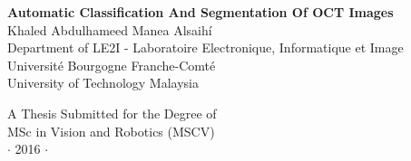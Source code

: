 

\newpage
\thispagestyle{empty}


\vspace*{2cm}
\begin{center}
{\Large\bf Automatic Classification And Segmentation Of OCT Images\\} \vspace{2cm} {\large
Khaled Abdulhameed Manea Alsaih\'i\\
\vspace{2cm}
Department of LE2I - Laboratoire Electronique, Informatique et Image \\
Université Bourgogne Franche-Comté \\
University of Technology Malaysia }
\end{center}

\vspace{7cm}
\begin{center}
{\large A Thesis Submitted for the Degree of \\MSc
in Vision and Robotics (MSCV) \\\vspace{0.3cm} $\cdot$ 2016
$\cdot$}
\end{center}
\singlespacing


